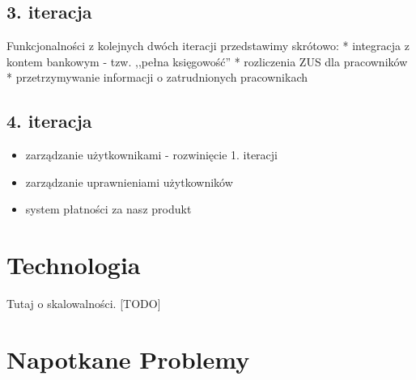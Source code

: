 \documentclass{beamer}
\begin{document}
\subsection{3. iteracja}
  \begin{frame}
    \begin{block}{}
      Funkcjonalności z kolejnych dwóch iteracji przedstawimy skrótowo: * integracja z kontem bankowym - tzw. ,,pełna księgowość'' * rozliczenia ZUS dla pracowników * przetrzymywanie informacji o zatrudnionych pracownikach
    \end{block}
  \end{frame}
\subsection{4. iteracja}
  \begin{frame}
    \begin{itemize}
      \item zarządzanie użytkownikami - rozwinięcie 1. iteracji
      \item zarządzanie uprawnieniami użytkowników
      \item system płatności za nasz produkt
    \end{itemize}
  \end{frame}
\section{Technologia}
  \begin{frame}
    \begin{block}{}
      Tutaj  o skalowalności.
      [TODO]
    \end{block}
  \end{frame}
\section{Napotkane Problemy}
\end{document}
